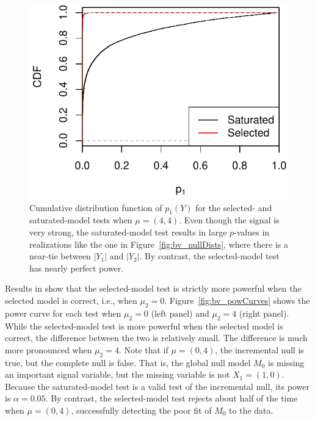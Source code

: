 \documentclass{article}
\begin{document}
\begin{figure}
  \centering
  \includegraphics[width=.5\textwidth]{figs/bivariateSelVSat_rocCurve.pdf}
  \caption{Cumulative distribution function of $p_1(Y)$ for the selected- and saturated-model tests when $\mu=(4,4)$. Even though the signal is very strong, the saturated-model test results in large $p$-values in realizations like the one in Figure~\ref{fig:bv_nullDists}, where there is a near-tie between $|Y_1|$ and $|Y_2|$. By contrast, the selected-model test has nearly perfect power.}
  \label{fig:bv_rocCurve}
\end{figure}

Results in \citet{fithian2014optimal} show that the selected-model test is strictly more powerful when the selected model is correct, i.e., when $\mu_2=0$. Figure~\ref{fig:bv_powCurves} shows the power curve for each test when $\mu_2=0$ (left panel) and $\mu_2=4$ (right panel). While the selected-model test is more powerful when the selected model is correct, the difference between the two is relatively small. The difference is much more pronounced when $\mu_2=4$. Note that if $\mu=(0,4)$, the incremental null is true, but the complete null is false. That is, the global null model $M_0$ is missing an important signal variable, but the missing variable is not $X_1 = (1,0)$. Because the saturated-model test is a valid test of the incremental null, its power is $\alpha=0.05$. By contrast, the selected-model test rejects about half of the time when $\mu=(0,4)$, successfully detecting the poor fit of $M_0$ to the data.
\end{document}

